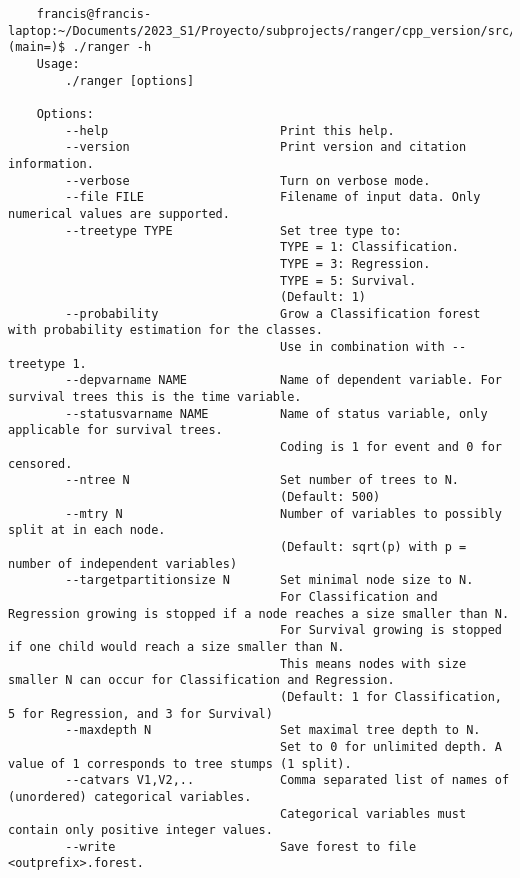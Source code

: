 \documentclass[12pt,oneside]{book}
\begin{document}
  \begin{lstlisting}
    francis@francis-laptop:~/Documents/2023_S1/Proyecto/subprojects/ranger/cpp_version/src/build (main=)$ ./ranger -h
    Usage: 
        ./ranger [options]
    
    Options:
        --help                        Print this help.
        --version                     Print version and citation information.
        --verbose                     Turn on verbose mode.
        --file FILE                   Filename of input data. Only numerical values are supported.
        --treetype TYPE               Set tree type to:
                                      TYPE = 1: Classification.
                                      TYPE = 3: Regression.
                                      TYPE = 5: Survival.
                                      (Default: 1)
        --probability                 Grow a Classification forest with probability estimation for the classes.
                                      Use in combination with --treetype 1.
        --depvarname NAME             Name of dependent variable. For survival trees this is the time variable.
        --statusvarname NAME          Name of status variable, only applicable for survival trees.
                                      Coding is 1 for event and 0 for censored.
        --ntree N                     Set number of trees to N.
                                      (Default: 500)
        --mtry N                      Number of variables to possibly split at in each node.
                                      (Default: sqrt(p) with p = number of independent variables)
        --targetpartitionsize N       Set minimal node size to N.
                                      For Classification and Regression growing is stopped if a node reaches a size smaller than N.
                                      For Survival growing is stopped if one child would reach a size smaller than N.
                                      This means nodes with size smaller N can occur for Classification and Regression.
                                      (Default: 1 for Classification, 5 for Regression, and 3 for Survival)
        --maxdepth N                  Set maximal tree depth to N.
                                      Set to 0 for unlimited depth. A value of 1 corresponds to tree stumps (1 split).
        --catvars V1,V2,..            Comma separated list of names of (unordered) categorical variables. 
                                      Categorical variables must contain only positive integer values.
        --write                       Save forest to file <outprefix>.forest.

\end{lstlisting}
\end{document}
